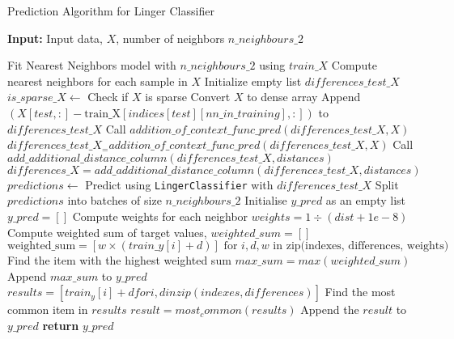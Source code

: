 \documentclass[a4paper, 12pt]{report}
\begin{document}
\begin{algorithm}[H]
    \caption{Prediction Algorithm for Linger Classifier}
    \textbf{Input:} Input data, $X$, number of neighbors $n\_neighbours\_2$
    \label{alg:linger_classifier_predict_implementation}
    \begin{algorithmic}[1]
            \State Fit Nearest Neighbors model with $n\_neighbours\_2$ using $train\_X$
            \State Compute nearest neighbors for each sample in $X$
            \State Initialize empty list $differences\_test\_X$
            \State $is\_sparse\_X \gets$ Check if $X$ is sparse
                \State Convert $X$ to dense array
            \EndIf
                    \State Append $(X[test, :] - \text{train\_X}[indices[test][nn\_in\_training], :])$ to $differences\_test\_X$
                \EndFor
            \EndFor
                \State Call $addition\_of\_context\_func\_pred(differences\_test\_X, X)$
                \State $differences\_test\_X_= addition\_of\_context\_func\_pred(differences\_test\_X, X)$
                \State Call $add\_additional\_distance\_column(differences\_test\_X, distances)$
                \State $differences\_X = add\_additional\_distance\_column(differences\_test\_X, distances)$
            \EndIf
            \State $predictions \gets$ Predict using \texttt{LingerClassifier} with $differences\_test\_X$
            \State Split $predictions$ into batches of size $n\_neighbours\_2$
            \State Initialise $y\_pred$ as an empty list 
            \State $y\_pred = []$
                    \State Compute weights for each neighbor
                    \State $weights = 1 \div (dist + 1e-8)$
                    \State Compute weighted sum of target values,
                    \State $weighted\_sum = []$
                    \State $\text{weighted\_sum} = \left[ w \times \left( train\_y[i] + d \right) \right] \text{ for } i, d, w \text{ in } \text{zip(indexes, differences, weights)}$
                    \State Find the item with the highest weighted sum
                    \State $max\_sum = max(weighted\_sum)$
                    \State Append $max\_sum$ to $y\_pred$
                \EndFor
            \Else
                    \State $results = [train_y[i] + d for i, d in zip(indexes, differences)]$
                    \State Find the most common item in $results$
                    \State $result = most_common(results)$
                    \State Append the $result$ to $y\_pred$
                \EndFor
            \EndIf
            \State \textbf{return} $y\_pred$
        \EndFunction
    \end{algorithmic}
\end{algorithm}
\end{document}
